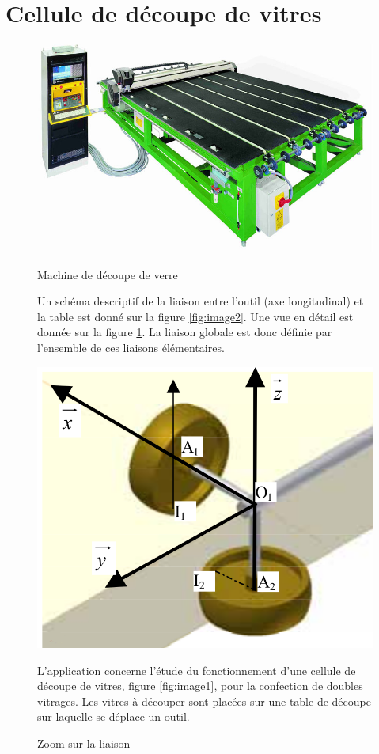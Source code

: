 

\section{Cellule de découpe de vitres}

\begin{figure}[htbp]
\begin{minipage}[c]{.48\linewidth}
\begin{center}
\includegraphics[width=0.8\linewidth]{img/machine_dec_verre.jpg}
\caption{Machine de découpe de verre}
\label{fig:image1}
\end{center}

Un schéma descriptif de la liaison entre l'outil (axe longitudinal) et la table est donné sur la figure \ref{fig:image2}. Une vue en détail est donnée sur la figure \ref{fig:image3}. La liaison globale est donc définie par l'ensemble de ces liaisons élémentaires.

\begin{center}
\includegraphics[width=0.5\linewidth]{img/Table2.png}
\caption{Zoom sur la liaison}
\label{fig:image3}
\end{center}
\end{minipage}
\hfill
\begin{minipage}[c]{.48\linewidth}
L'application concerne l'étude du fonctionnement d'une cellule de découpe de vitres, figure \ref{fig:image1}, pour la confection de doubles vitrages. Les vitres à découper sont placées sur une table de découpe sur laquelle se déplace un outil.


\end{minipage}
\end{figure}
